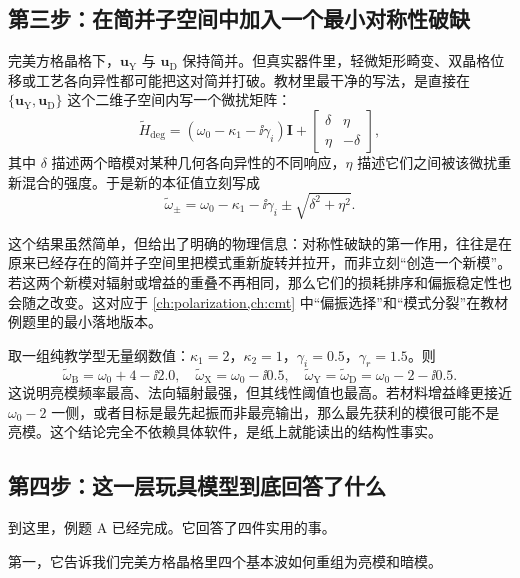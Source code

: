 \subsection{第三步：在简并子空间中加入一个最小对称性破缺}
完美方格晶格下，$\bm{u}_{\mathrm{Y}}$ 与 $\bm{u}_{\mathrm{D}}$ 保持简并。但真实器件里，轻微矩形畸变、双晶格位移或工艺各向异性都可能把这对简并打破。教材里最干净的写法，是直接在 $\{\bm{u}_{\mathrm{Y}},\bm{u}_{\mathrm{D}}\}$ 这个二维子空间内写一个微扰矩阵：
\begin{equation}
\tilde{H}_{\mathrm{deg}}
=
\left(\omega_0-\kappa_1-\ii\gamma_i\right)\bm{I}
+
\begin{bmatrix}
\delta & \eta \\
\eta & -\delta
\end{bmatrix},
\label{eq:worked-deg-pert}
\end{equation}
其中 $\delta$ 描述两个暗模对某种几何各向异性的不同响应，$\eta$ 描述它们之间被该微扰重新混合的强度。于是新的本征值立刻写成
\begin{equation}
\tilde{\omega}_{\pm}
=
\omega_0-\kappa_1-\ii\gamma_i
\pm
\sqrt{\delta^2+\eta^2}.
\label{eq:worked-deg-split}
\end{equation}

这个结果虽然简单，但给出了明确的物理信息：对称性破缺的第一作用，往往是在原来已经存在的简并子空间里把模式重新旋转并拉开，而非立刻“创造一个新模”。若这两个新模对辐射或增益的重叠不再相同，那么它们的损耗排序和偏振稳定性也会随之改变。这对应于 \cref{ch:polarization,ch:cmt} 中“偏振选择”和“模式分裂”在教材例题里的最小落地版本。

\begin{ExampleBox}
取一组纯教学型无量纲数值：$\kappa_1=2$，$\kappa_2=1$，$\gamma_i=0.5$，$\gamma_r=1.5$。则
\[
\tilde{\omega}_{\mathrm{B}}=\omega_0+4-\ii 2.0,\quad
\tilde{\omega}_{\mathrm{X}}=\omega_0-\ii 0.5,\quad
\tilde{\omega}_{\mathrm{Y}}=\tilde{\omega}_{\mathrm{D}}=\omega_0-2-\ii 0.5.
\]
这说明亮模频率最高、法向辐射最强，但其线性阈值也最高。若材料增益峰更接近 $\omega_0-2$ 一侧，或者目标是最先起振而非最亮输出，那么最先获利的模很可能不是亮模。这个结论完全不依赖具体软件，是纸上就能读出的结构性事实。
\end{ExampleBox}

\subsection{第四步：这一层玩具模型到底回答了什么}
到这里，例题 A 已经完成。它回答了四件实用的事。

第一，它告诉我们完美方格晶格里四个基本波如何重组为亮模和暗模。

